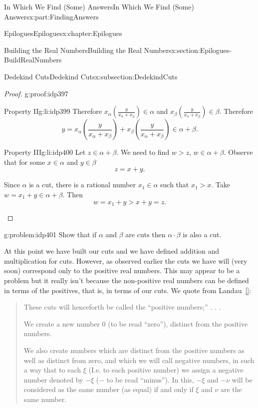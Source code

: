 \documentclass[oneside,10pt,]{book}
\newcommand{\xreffont}{\relax}
\numberwithin{equation}{section}
\begin{document}
\begin{partptx}{In Which We Find (Some) Answers}{}{In Which We Find (Some) Answers}{}{}{x:part:FindingAnswers}
\begin{chapterptx}{Epilogues}{}{Epilogues}{}{}{x:chapter:Epilogues}
\begin{sectionptx}{Building the Real Numbers}{}{Building the Real Numbers}{}{}{x:section:Epilogues-BuildRealNumbers}
\begin{subsectionptx}{Dedekind Cuts}{}{Dedekind Cuts}{}{}{x:subsection:DedekindCuts}
\begin{proof}{}{g:proof:idp397}
\begin{descriptionlist}
\begin{dlimedium}{Property II}{g:li:idp399}
Therefore \(x_\alpha\left(\frac{y}{x_\alpha+x_\beta}\right)\in\alpha\) and \(x_\beta\left(\frac{y}{x_\alpha+x_\beta}\right)\in\beta\). Therefore%
\begin{equation*}
y=x_\alpha\left(\frac{y}{x_\alpha+x_\beta}\right)+x_\beta\left(\frac{y}{x_\alpha+x_\beta}\right)\in\alpha+\beta\text{.}
\end{equation*}
%
\end{dlimedium}%
\begin{dlimedium}{Property III}{g:li:idp400}%
Let \(z\in\alpha+\beta\). We need to find \(w>z\), \(w\in\alpha+\beta\). Observe that for some \(x\in\alpha\) and \(y\in\beta\)%
\begin{equation*}
z=x+y\text{.}
\end{equation*}
%
\par
Since \(\alpha\) is a cut, there is a rational number \(x_1\in\alpha\) such that \(x_1>x\). Take \(w=x_1+y\in\alpha+\beta\). Then%
\begin{equation*}
w=x_1+y>x+y=z\text{.}
\end{equation*}
%
\end{dlimedium}%
\end{descriptionlist}
%
\end{proof}
\begin{problem}{}{g:problem:idp401}%
 Show that if \(\alpha\) and \(\beta\) are cuts then \(\alpha\cdot\beta\) is also a cut.%
\end{problem}
At this point we have built our cuts and we have defined addition and multiplication for cuts. However, as observed earlier the cuts we have will (very soon) correspond only to the positive real numbers. This may appear to be a problem but it really isn't because the non-positive real numbers can be defined in terms of the positives, that is, in terms of our cuts. We quote from Landau~\hyperlink{x:biblio:landau66__found_analy}{[{\xreffont 7}]}:%
\begin{quote}%
These cuts will henceforth be called the ``positive numbers;''  .  .  .%
\par
We create a new number \(0\) (to be read ``zero''), distinct from the positive numbers.%
\par
We also create numbers which are distinct from the positive numbers as well as distinct from zero, and which we will call negative numbers, in such a way that to each \(\xi\) (I.e. to each positive number) we assign a negative number denoted by \(-\xi\) (\(-\) to be read ``minus''). In this, \(-\xi\) and \(-\nu\) will be considered as the same number (as equal) if and only if \(\xi\) and \(\nu\) are the same number.%

\end{quote}
\end{subsectionptx}
\end{sectionptx}
\end{chapterptx}
\end{partptx}
\end{document}
